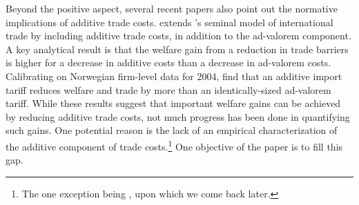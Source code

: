 \documentclass[a4paper,11pt]{article}
\begin{document}
Beyond the positive aspect, several recent papers also point out the normative implications of additive trade costs. \citet{sorensen2014} extends \citet{melitz}'s seminal model of international trade by including additive trade costs, in addition to the ad-valorem component. A key analytical result is that the welfare gain from a reduction in trade barriers is higher for a decrease in additive costs than a decrease in ad-valorem costs. Calibrating on Norwegian firm-level data for 2004, \citet{Irrazabal_2015} find that an additive import tariff reduces welfare and trade by more than an identically-sized ad-valorem tariff. While these results suggest that important welfare gains can be achieved by reducing additive trade costs, not much progress has been done in quantifying such gains. One potential reason is the lack of an empirical characterization of the additive component of trade costs.\footnote{The one exception being \citet{Irrazabal_2015}, upon which we come back later.} One objective of the paper is to fill this gap. \bigskip
\end{document}

